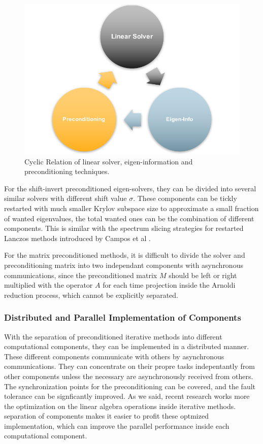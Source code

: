 \begin{figure}[htbp]
	\centering
	\includegraphics[width=5.2in]{fig/cyclic.pdf}
	\caption{Cyclic Relation of linear solver, eigen-information and preconditioning techniques.}
	\label{fig:cyclic}
\end{figure}

For the shift-invert preconditioned eigen-solvers, they can be divided into several similar solvers with different shift value $\sigma$. These components can be tickly restarted with much smaller Krylov subspace size to approximate a small fraction of wanted eigenvalues, the total wanted ones can be the combination of different components. This is similar with the spectrum slicing strategies for restarted Lanczos methods introduced by Campos et al \cite{campos2012strategies}.

For the matrix preconditioned methods, it is difficult to divide the solver and preconditioning matrix into two independant components with asynchronous communications, since the preconditioned matrix $M$ should be left or right multiplied with the operator $A$ for each time projection inside the Arnoldi reduction process, which cannot be explicitly separated. 

\subsubsection{Distributed and Parallel Implementation of Components}

With the separation of preconditioned iterative methods into different computational components, they can be implemented in a distributed manner. These different components communicate with others by asynchronous communications. They can concentrate on their propre tasks indepentantly from other components unless the necessary are asynchronously received from others. The synchronization points for the preconditioning can be covered, and the fault tolerance can be signficantly improved. As we said, recent research works more the optimization on the linear algebra operations inside iterative methods. separation of components makes it easier to profit these optmized implementation, which can improve the parallel performance inside each computational component.

